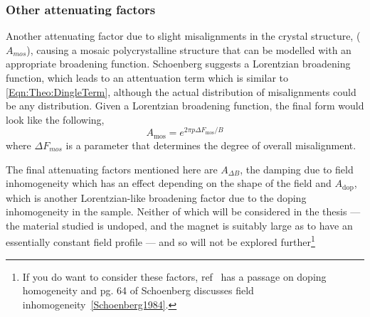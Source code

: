 \subsubsection{Other attenuating factors}

Another attenuating factor due to slight misalignments in the crystal structure, ($A_{mos}$), causing a mosaic polycrystalline structure that can be modelled with an appropriate broadening function. Schoenberg suggests a Lorentzian broadening function, which leads to an attentuation term which is similar to \ref{Eqn:Theo:DingleTerm}, although the actual distribution of misalignments could be any distribution. Given a Lorentzian broadening function, the final form would look like the following,
\begin{equation}
  A_{\textrm{mos}} = e^{2\pi p \Delta F_{\textrm{mos}}/B}
\end{equation}
where $\Delta F_{mos}$ is a parameter that determines the degree of overall misalignment.

The final attenuating factors mentioned here are $A_{\Delta B}$, the damping due to field inhomogeneity which has an effect depending on the shape of the field and $A_{\textrm{dop}}$, which is another Lorentzian-like broadening factor due to the doping inhomogeneity in the sample. Neither of which will be considered in the thesis --- the material studied is undoped, and the magnet is suitably large as to have an essentially constant field profile --- and so will not be explored further\footnote{If you do want to consider these factors, ref~\cite{Rourke2010b} has a passage on doping homogeneity and pg. 64 of Schoenberg discusses field inhomogeneity~\ref{Schoenberg1984}.}




